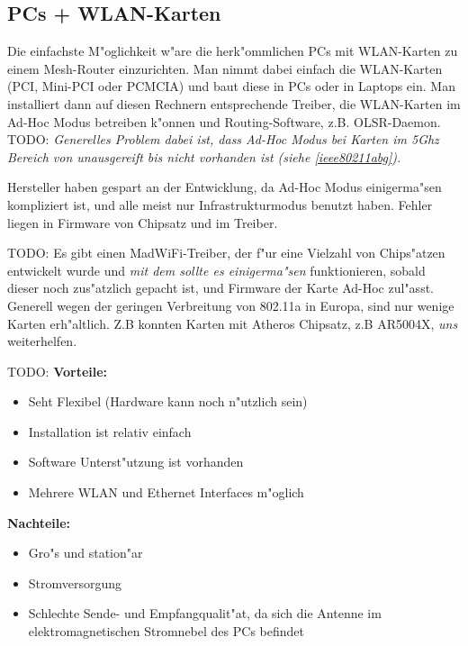 \subsection{PCs + WLAN-Karten}

Die einfachste M"oglichkeit w"are die herk"ommlichen PCs mit WLAN-Karten
zu einem Mesh-Router einzurichten.
Man nimmt dabei einfach die WLAN-Karten (PCI, Mini-PCI oder PCMCIA) und
baut diese in PCs oder in Laptops ein. Man installiert dann auf diesen
Rechnern entsprechende Treiber, die WLAN-Karten im Ad-Hoc Modus betreiben
k"onnen und Routing-Software, z.B. OLSR-Daemon.
TODO: 	
\emph{Generelles Problem dabei ist, dass Ad-Hoc Modus bei Karten im 5Ghz 
Bereich von unausgereift bis nicht vorhanden ist (siehe \ref{ieee80211abg}).}

Hersteller haben gespart an der Entwicklung, da Ad-Hoc Modus
einigerma"sen kompliziert ist, und alle meist nur Infrastrukturmodus
benutzt haben. Fehler liegen in Firmware von Chipsatz und im Treiber.

TODO: 	
Es gibt einen MadWiFi-Treiber, der f"ur eine Vielzahl von Chips"atzen
entwickelt wurde und \emph{mit dem sollte es einigerma"sen} funktionieren, sobald
dieser noch zus"atzlich gepacht ist, und Firmware der Karte Ad-Hoc zul"asst.
Generell wegen der geringen Verbreitung von 802.11a in Europa, sind
nur wenige Karten erh"altlich. Z.B konnten Karten mit Atheros Chipsatz,
z.B AR5004X, \emph{uns} weiterhelfen.

TODO: 	
\textbf{Vorteile:}

\begin{itemize} 
\item Seht Flexibel (Hardware kann noch n"utzlich sein)
\item Installation ist relativ einfach
\item Software Unterst"utzung ist vorhanden
\item Mehrere WLAN und Ethernet Interfaces m"oglich 
\end{itemize}

\textbf{Nachteile: }
\begin{itemize}
\item Gro"s und station"ar
\item Stromversorgung 
\item Schlechte Sende- und Empfangqualit"at, da sich die Antenne im
elektromagnetischen Stromnebel des PCs befindet
\end{itemize}




